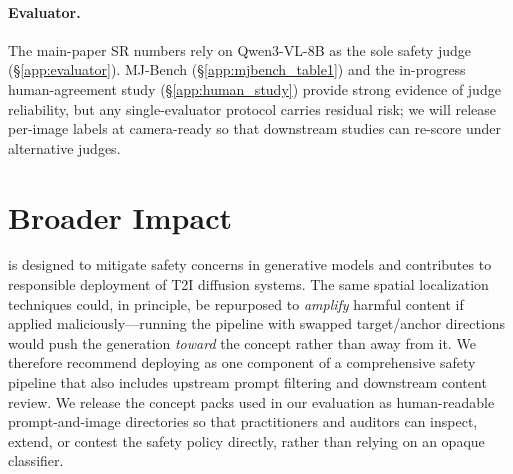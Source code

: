\paragraph{Evaluator.}
The main-paper SR numbers rely on Qwen3-VL-8B as the sole safety judge (\S\ref{app:evaluator}). MJ-Bench (\S\ref{app:mjbench_table1}) and the in-progress human-agreement study (\S\ref{app:human_study}) provide strong evidence of judge reliability, but any single-evaluator protocol carries residual risk; we will release per-image labels at camera-ready so that downstream studies can re-score under alternative judges.

\section{Broader Impact}
\label{app:broader_impact}

\ours{} is designed to mitigate safety concerns in generative models and contributes to responsible deployment of T2I diffusion systems. The same spatial localization techniques could, in principle, be repurposed to \emph{amplify} harmful content if applied maliciously---running the pipeline with swapped target/anchor directions would push the generation \emph{toward} the concept rather than away from it. We therefore recommend deploying \ours{} as one component of a comprehensive safety pipeline that also includes upstream prompt filtering and downstream content review. We release the concept packs used in our evaluation as human-readable prompt-and-image directories so that practitioners and auditors can inspect, extend, or contest the safety policy directly, rather than relying on an opaque classifier.
